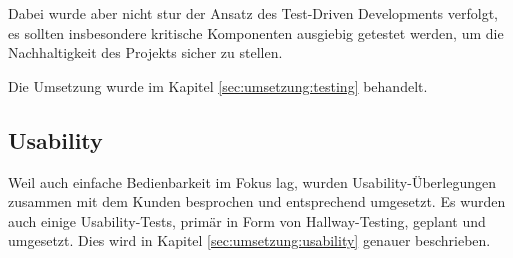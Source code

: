 Dabei wurde aber nicht stur der Ansatz des Test-Driven Developments verfolgt, es sollten insbesondere kritische Komponenten ausgiebig getestet werden, um die Nachhaltigkeit des Projekts sicher zu stellen.

Die Umsetzung wurde im Kapitel \ref{sec:umsetzung:testing} behandelt.

\subsection*{Usability}

Weil auch einfache Bedienbarkeit im Fokus lag, wurden Usability-Überlegungen zusammen mit dem Kunden besprochen und entsprechend umgesetzt. Es wurden auch einige Usability-Tests, primär in Form von Hallway-Testing, geplant und umgesetzt. Dies wird in Kapitel \ref{sec:umsetzung:usability} genauer beschrieben.